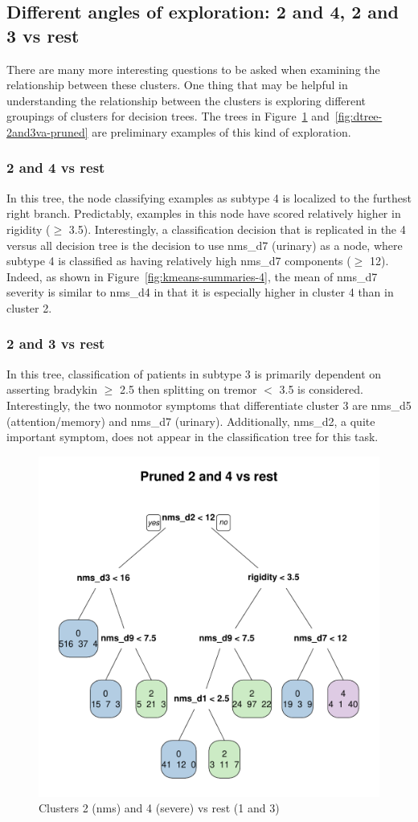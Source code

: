 \documentclass[10pt]{article}
\begin{document}
\subsection{Different angles of exploration: 2 and 4, 2 and 3 vs rest}

There are many more interesting questions to be asked when examining the
relationship between these clusters. One thing that may be helpful in
understanding the relationship between the clusters is exploring different
groupings of clusters for decision trees. The trees in
Figure~\ref{fig:dtree-2and4va-pruned} and~\ref{fig:dtree-2and3va-pruned} are
preliminary examples of this kind
of exploration.

\subsubsection{2 and 4 vs rest}
In this tree, the node classifying examples as subtype 4 is
localized to the furthest right branch. Predictably, examples in this node have
scored relatively higher in rigidity ($\geq$ 3.5). Interestingly, a classification
decision that is replicated in the 4 versus all decision tree is the decision
to use nms\_d7 (urinary) as a node, where subtype 4 is classified as having
relatively high nms\_d7 components ($\geq$ 12). Indeed, as shown in
Figure~\ref{fig:kmeans-summaries-4}, the mean of nms\_d7 severity is similar to
nms\_d4 in that it is especially higher in cluster 4 than in cluster 2.

\subsubsection{2 and 3 vs rest}
In this tree, classification of patients in subtype 3 is primarily dependent on
asserting bradykin $\geq$ 2.5 then splitting on tremor $<$ 3.5 is considered.
Interestingly, the two nonmotor symptoms that differentiate cluster 3 are
nms\_d5 (attention/memory) and nms\_d7 (urinary). Additionally, nms\_d2, a
quite important symptom, does not appear in the classification tree for this
task.

\begin{figure}[h]
  \centering
  \includegraphics[width=0.6\linewidth]{dtree-2and4va-pruned.pdf}
  \caption{Clusters 2 (nms) and 4 (severe) vs rest (1 and 3)}
  \label{fig:dtree-2and4va-pruned}
\end{figure}
\end{document}
